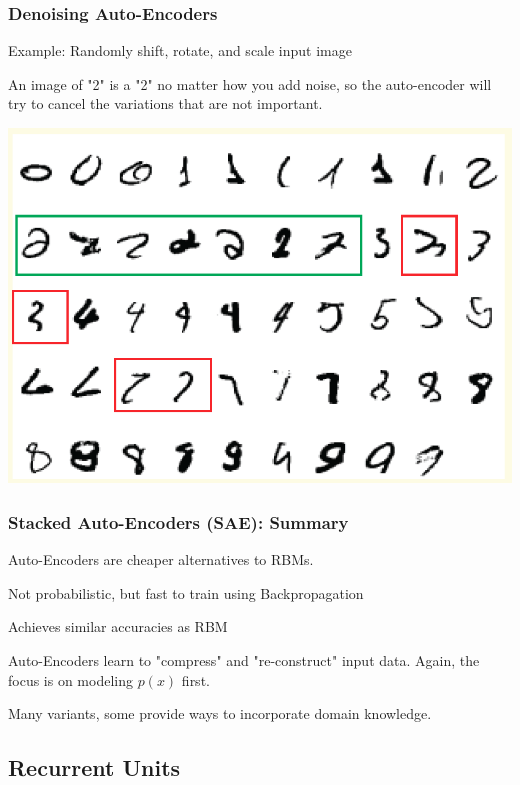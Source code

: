 \begin{frame}
\frametitle{Denoising Auto-Encoders}
\bi
\item Example: Randomly shift, rotate, and scale input image
\item An image of "2" is a "2" no matter how you add noise, so the auto-encoder will try to cancel the variations that are not important. 
\ei
\centerline{\includegraphics[scale=0.19]{figs/digit2}}
\end{frame}

\begin{frame}
\frametitle{Stacked Auto-Encoders (SAE): Summary}
\be
\item Auto-Encoders are cheaper alternatives to RBMs.
	\bi
	\item Not probabilistic, but fast to train using Backpropagation
	\item Achieves similar accuracies as RBM \cite{bengio06greedy}
	\ei
\pause
\item Auto-Encoders learn to "compress" and "re-construct" input data. Again, the focus is on modeling $p(x)$ first.  \pause
\item Many variants, some provide ways to incorporate domain knowledge.
\ee
\end{frame}


\subsection[Recurrent Units]{Recurrent Units}

